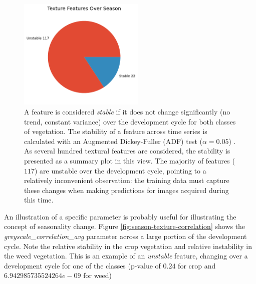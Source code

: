 \documentclass[letterpaper]{article}
\begin{document}
{%


\begin{figure}[h!]
	\centering
	\includegraphics[width=6cm]{./figures/season-texture.png}
	\caption[Stability of factor over growing season]{A feature is considered \textit{stable} if it does not change significantly (no trend, constant variance) over the development cycle for both classes of vegetation. The stability of a feature across time series is calculated with an Augmented Dickey-Fuller (ADF) test ($\alpha=0.05$) \parencite{Dickey1979-ft}. As several hundred textural features are considered, the stability is presented as a summary plot in this view. The majority of features ($117$) are unstable over the development cycle, pointing to a relatively inconvenient observation: the training data must capture these changes when making predictions for images acquired during this time.}
	\label{fig:season-texture}
\end{figure}

An illustration of a specific parameter is probably useful for illustrating the concept of seasonality change. Figure \ref{fig:season-texture-correlation} shows the \textit{greyscale\_correlation\_avg} parameter across a large portion of the development cycle. Note the relative stability in the crop vegetation and relative instability in the weed vegetation. This is an example of an \textit{unstable} feature, changing over a development cycle for one of the classes (p-value of $0.24$ for crop and $6.942985735524264e-09$ for weed)


}
\end{document}

